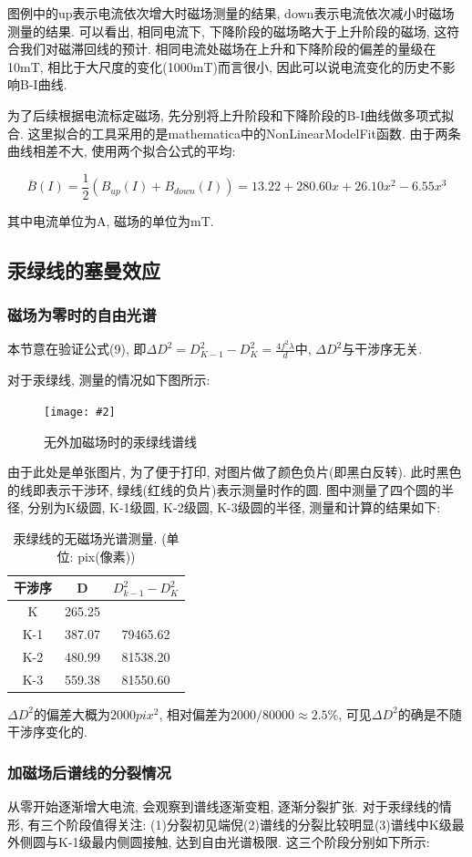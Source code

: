 \documentclass[12pt,a4paper]{article}
\newcommand{\be}[1]{
    \begin{equation}
        #1
    \end{equation}
}
\newcommand{\bfig}[3]{
    \begin{figure}[H]
        \centering
        \texttt{[image: \#2]}
        \caption{#3}
    \end{figure}
}
\begin{document}
图例中的up表示电流依次增大时磁场测量的结果, down表示电流依次减小时磁场测量的结果. 可以看出, 相同电流下, 下降阶段的磁场略大于上升阶段的磁场, 
这符合我们对磁滞回线的预计. 相同电流处磁场在上升和下降阶段的偏差的量级在10mT, 相比于大尺度的变化(1000mT)而言很小, 因此可以说电流变化的历史不影响B-I曲线. 

为了后续根据电流标定磁场, 先分别将上升阶段和下降阶段的B-I曲线做多项式拟合. 这里拟合的工具采用的是mathematica中的NonLinearModelFit函数. 
由于两条曲线相差不大, 使用两个拟合公式的平均: 
\be{\overline{B}(I)=\frac{1}{2}(B_{up}(I)+B_{down}(I))=13.22 + 280.60 x + 26.10 x^2 - 6.55 x^3}
其中电流单位为A, 磁场的单位为mT.
\subsection{汞绿线的塞曼效应}
\subsubsection{磁场为零时的自由光谱}
本节意在验证公式(9), 即$\Delta{D}^2=D_{K-1}^2-D_{K}^2=\frac{4f^2\lambda}{d}$中, $\Delta{D}^2$与干涉序无关. 

对于汞绿线, 测量的情况如下图所示: 
\bfig{0.6}{free_g_measure.png}{无外加磁场时的汞绿线谱线}
由于此处是单张图片, 为了便于打印, 对图片做了颜色负片(即黑白反转). 此时黑色的线即表示干涉环, 绿线(红线的负片)表示测量时作的圆. 
图中测量了四个圆的半径, 分别为K级圆, K-1级圆, K-2级圆, K-3级圆的半径, 测量和计算的结果如下: 

\begin{table}[H]
    \centering
    \begin{tabular}{|c|c|c|}
    \hline
    干涉序    & D      & $D_{k-1}^2-D_K^2$  \\ \hline
    K   & 265.25 &          \\ \hline
    K-1 & 387.07 & 79465.62 \\ \hline
    K-2 & 480.99 & 81538.20 \\ \hline
    K-3 & 559.38 & 81550.60 \\ \hline
    \end{tabular}
    \caption{汞绿线的无磁场光谱测量. (单位: pix(像素))}
    \end{table}
$\Delta D^2$的偏差大概为$2000pix^2$, 相对偏差为$2000/80000\approx 2.5\%$, 可见$\Delta D^2$的确是不随干涉序变化的. 

\subsubsection{加磁场后谱线的分裂情况}
从零开始逐渐增大电流, 会观察到谱线逐渐变粗, 逐渐分裂扩张. 对于汞绿线的情形, 有三个阶段值得关注: (1)分裂初见端倪(2)谱线的分裂比较明显(3)谱线中K级最外侧圆与K-1级最内侧圆接触, 达到自由光谱极限. 
这三个阶段分别如下所示: 
\end{document}
